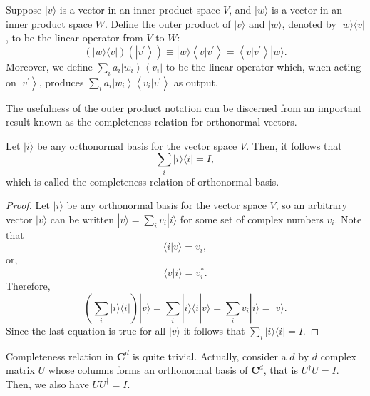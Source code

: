 

Suppose $|v\rangle$ is a vector in an inner product space $V$, and $|w\rangle$ is a vector in an inner product space $W$. Define the outer product of $|v\rangle$ and $|w\rangle$, denoted by $|w\rangle\langle v|$, to be the linear operator from $V$ to $W$:
\begin{equation}
    (|w\rangle\langle v|)\left(\left|v^{\prime}\right\rangle\right) \equiv|w\rangle\left\langle v | v^{\prime}\right\rangle=\left\langle v | v^{\prime}\right\rangle|w\rangle.
\end{equation}
Moreover, we define $\sum_{i} a_{i}\left|w_{i}\right\rangle\left\langle v_{i}\right|$ to be the linear operator which, when acting on $\left|v^{\prime}\right\rangle$, produces $\sum_{i} a_{i}\left|w_{i}\right\rangle\left\langle v_{i} | v^{\prime}\right\rangle$ as output.

The usefulness of the outer product notation can be discerned from an important result known as the completeness relation for orthonormal vectors. 

\begin{theorem}
    Let $|i\rangle$ be any orthonormal basis for the vector space $V$. Then, it follows that
\begin{equation}
    \sum_{i}|i\rangle\langle i|=I,
\end{equation}
which is called the completeness relation of orthonormal basis.
\end{theorem}

\begin{proof}
    Let $|i\rangle$ be any orthonormal basis for the vector space $V$, so an arbitrary vector $|v\rangle$ can be written $|v\rangle=\sum_{i} v_{i}|i\rangle$ for some set of complex numbers $v_{i}$. Note that
\begin{equation}
    \langle i | v\rangle=v_{i},
\end{equation}
or,
\begin{equation}
    \langle v | i\rangle=v_{i}^{*}.
\end{equation}
Therefore,
\begin{equation}
    \left(\sum_{i}|i\rangle\langle i|\right)|v\rangle=\sum_{i}|i\rangle\langle i | v\rangle=\sum_{i} v_{i}|i\rangle=|v\rangle.
\end{equation}
Since the last equation is true for all $|v\rangle$ it follows that $\sum_{i}|i\rangle\langle i|=I.$
\end{proof}
\begin{remark}
    Completeness relation in $\mathbf{C}^{d}$ is quite trivial. Actually, consider a $d$ by $d$ complex matrix $U$ whose columns forms an orthonormal basis of $\mathbf{C}^{d}$, that is $U^{\dagger}U= I.$ Then, we also have $UU^{\dagger}= I.$
\end{remark}


